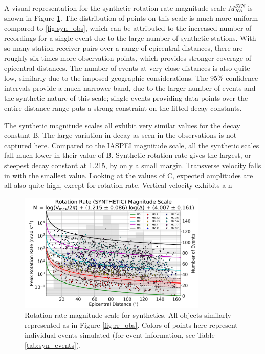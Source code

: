 \documentclass{gji}
\begin{document}
A visual representation for the synthetic rotation rate magnitude scale $M_{RR}^{SYN}$ is shown in Figure \ref{fig:syn_scale}. The distribution of points on this scale is much more uniform compared to \ref{fig:syn_obs}, which can be attributed to the increased number of recordings for a single event due to the large number of synthetic stations. With so many station receiver pairs over a range of epicentral distances, there are roughly six times more observation points, which provides stronger coverage of epicentral distances. The number of events at very close distances is also quite low, similarly due to the imposed geographic considerations. The 95\% confidence intervals provide a much narrower band, due to the larger number of events and the synthetic nature of this scale; single events providing data points over the entire distance range puts a strong constraint on the fitted decay constants.

The synthetic magnitude scales all exhibit very similar values for the decay constant B. The large variation in decay as seen in the observations is not captured here. Compared to the IASPEI magnitude scale, all the synthetic scales fall much lower in their value of B. Synthetic rotation rate gives the largest, or steepest decay constant at 1.215, by only a small margin. Transverse velocity falls in with the smallest value. Looking at the values of C, expected amplitudes are all also quite high, except for rotation rate. Vertical velocity exhibits a n

\begin{figure}
\centerline{\includegraphics[width=0.8\textwidth]{RR_SYN}}
\caption{Rotation rate magnitude scale for synthetics. All objects similarly represented as in Figure \ref{fig:rr_obs}. Colors of points here represent individual events simulated (for event information, see Table \ref{tab:syn_events}).}
\label{fig:syn_scale}
\end{figure}
\end{document}
